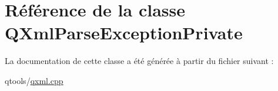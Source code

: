 \hypertarget{class_q_xml_parse_exception_private}{}\section{Référence de la classe Q\+Xml\+Parse\+Exception\+Private}
\label{class_q_xml_parse_exception_private}


La documentation de cette classe a été générée à partir du fichier suivant \+:\begin{DoxyCompactItemize}
\item 
qtools/\hyperlink{qxml_8cpp}{qxml.\+cpp}\end{DoxyCompactItemize}
